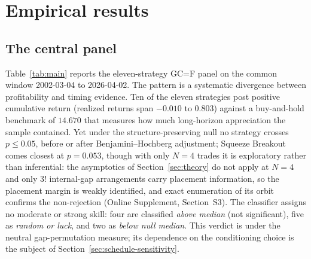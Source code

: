 \documentclass[preprint,12pt]{elsarticle}
\theoremstyle{definition}
\begin{document}
\section{Empirical results}

\subsection{The central panel}

Table~\ref{tab:main} reports the eleven-strategy GC=F panel on the common window 2002-03-04 to 2026-04-02. The pattern is a systematic divergence between profitability and timing evidence. Ten of the eleven strategies post positive cumulative return (realized returns span $-0.010$ to $0.803$) against a buy-and-hold benchmark of $14.670$ that measures how much long-horizon appreciation the sample contained. Yet under the structure-preserving null no strategy crosses $p\le0.05$, before or after Benjamini--Hochberg adjustment; Squeeze Breakout comes closest at $p=0.053$, though with only $N=4$ trades it is exploratory rather than inferential: the asymptotics of Section~\ref{sec:theory} do not apply at $N=4$ and only $3!$ internal-gap arrangements carry placement information, so the placement margin is weakly identified, and exact enumeration of its orbit confirms the non-rejection (Online Supplement, Section~S3). The classifier assigns no moderate or strong skill: four are classified \emph{above median} (not significant), five as \emph{random or luck}, and two as \emph{below null median}. This verdict is under the neutral gap-permutation measure; its dependence on the conditioning choice is the subject of Section~\ref{sec:schedule-sensitivity}.
\end{document}
